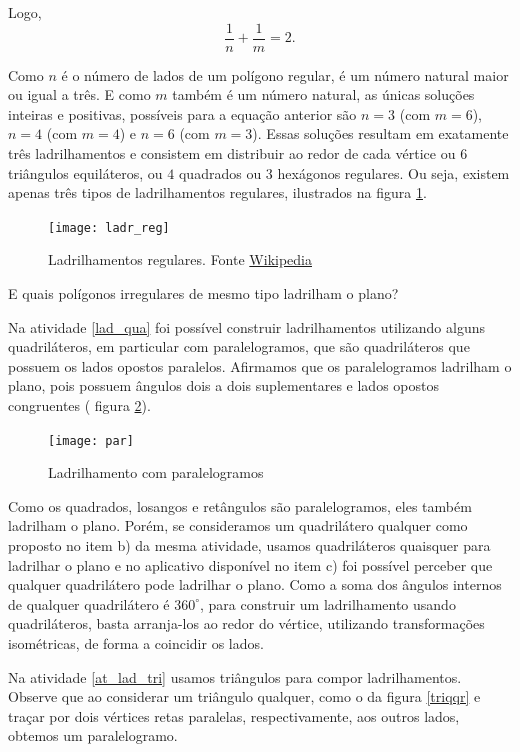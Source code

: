 Logo,
\begin{equation*}
\frac{1}{n}+\frac{1}{m}=2.
\end{equation*}

Como $n$ é o número de lados de um polígono regular, é um número natural maior ou igual a três. E como $m$ também é um número natural, as únicas soluções inteiras e positivas, possíveis para a equação anterior são $n=3$ (com $m=6$), $n=4$ (com $m=4$) e $n=6$ (com $m=3$). Essas soluções resultam em exatamente três ladrilhamentos e consistem em distribuir ao redor de cada vértice ou $6$ triângulos equiláteros, ou $4$ quadrados ou $3$ hexágonos regulares. Ou seja, existem apenas três tipos de ladrilhamentos regulares, ilustrados na figura \ref{ladr_reg}.



\begin{figure}[H]
\centering
\texttt{[image: ladr\_reg]}
\label{ladr_reg}
\caption{Ladrilhamentos regulares. Fonte \href{https://en.wikipedia.org/wiki/Euclidean_tilings_by_convex_regular_polygons}{Wikipedia}}
\end{figure}



E quais polígonos irregulares de mesmo tipo ladrilham o plano?
 
Na atividade \ref{lad_qua} foi possível construir ladrilhamentos utilizando alguns quadriláteros, em particular com paralelogramos, que são quadriláteros que possuem os lados opostos paralelos. Afirmamos que os paralelogramos ladrilham o plano, pois possuem ângulos dois a dois suplementares e lados opostos congruentes ( figura \ref{par}).

\begin{figure}[H]
\centering
\texttt{[image: par]}
\label{par}
\caption{Ladrilhamento com paralelogramos}
\end{figure}


Como os quadrados, losangos e retângulos são paralelogramos, eles também ladrilham o plano.
Porém, se consideramos um quadrilátero qualquer como proposto no item b) da mesma atividade, usamos quadriláteros quaisquer para ladrilhar o plano e no aplicativo disponível no item c) foi possível perceber que qualquer quadrilátero pode ladrilhar o plano. Como a  soma dos ângulos internos de qualquer quadrilátero é $360^{\circ}$, para construir um ladrilhamento usando quadriláteros, basta arranja-los ao redor do vértice, utilizando transformações isométricas, de forma a coincidir os lados. 

Na atividade \ref{at_lad_tri} usamos triângulos para compor ladrilhamentos. Observe que ao considerar um triângulo qualquer, como o da figura \ref{triqqr} e traçar por dois vértices retas paralelas, respectivamente, aos outros lados, obtemos um paralelogramo. 

